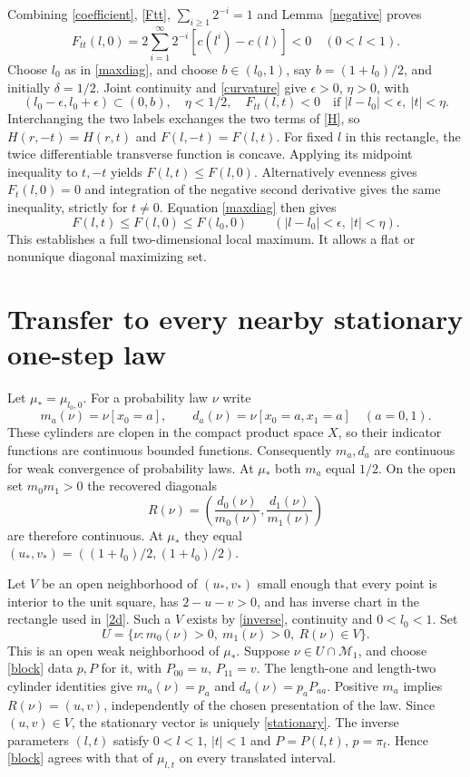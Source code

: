 \documentclass[11pt]{article}
\begin{document}
Combining \eqref{coefficient}, \eqref{Ftt}, $\sum_{i\geq1}2^{-i}=1$ and Lemma~\ref{negative} proves
\begin{equation}
 F_{tt}(l,0)=2\sum_{i=1}^{\infty}2^{-i}[c(l^i)-c(l)]<0
 \quad(0<l<1).\label{curvature}
\end{equation}
Choose $l_0$ as in \eqref{maxdiag}, and choose $b\in(l_0,1)$, say $b=(1+l_0)/2$, and initially $\delta=1/2$. Joint continuity and \eqref{curvature} give $\epsilon>0$, $\eta>0$, with
\[
 (l_0-\epsilon,l_0+\epsilon)\subset(0,b),\quad \eta<1/2,
 \quad F_{tt}(l,t)<0\quad\text{if }|l-l_0|<\epsilon,\ |t|<\eta.
\]
Interchanging the two labels exchanges the two terms of \eqref{H}, so $H(r,-t)=H(r,t)$ and $F(l,-t)=F(l,t)$. For fixed $l$ in this rectangle, the twice differentiable transverse function is concave. Applying its midpoint inequality to $t,-t$ yields $F(l,t)\leq F(l,0)$. Alternatively evenness gives $F_t(l,0)=0$ and integration of the negative second derivative gives the same inequality, strictly for $t\ne0$. Equation \eqref{maxdiag} then gives
\begin{equation}
 F(l,t)\leq F(l,0)\leq F(l_0,0)\qquad
 (|l-l_0|<\epsilon,\ |t|<\eta).\label{2d}
\end{equation}
This establishes a full two-dimensional local maximum. It allows a flat or nonunique diagonal maximizing set.

\section{Transfer to every nearby stationary one-step law}
Let $\mu_* =\mu_{l_0,0}$. For a probability law $\nu$ write
\[
 m_a(\nu)=\nu[x_0=a],\qquad d_a(\nu)=\nu[x_0=a,x_1=a]
 \quad(a=0,1).
\]
These cylinders are clopen in the compact product space $X$, so their indicator functions are continuous bounded functions. Consequently $m_a,d_a$ are continuous for weak convergence of probability laws. At $\mu_*$ both $m_a$ equal $1/2$. On the open set $m_0m_1>0$ the recovered diagonals
\[
 R(\nu)=\left(\frac{d_0(\nu)}{m_0(\nu)},
                 \frac{d_1(\nu)}{m_1(\nu)}\right)
\]
are therefore continuous. At $\mu_*$ they equal $(u_*,v_*)=((1+l_0)/2,(1+l_0)/2)$.

Let $V$ be an open neighborhood of $(u_*,v_*)$ small enough that every point is interior to the unit square, has $2-u-v>0$, and has inverse chart in the rectangle used in \eqref{2d}. Such a $V$ exists by \eqref{inverse}, continuity and $0<l_0<1$. Set
\[
 U=\{\nu:m_0(\nu)>0,\ m_1(\nu)>0,\ R(\nu)\in V\}.
\]
This is an open weak neighborhood of $\mu_*$. Suppose $\nu\in U\cap\mathcal M_1$, and choose \eqref{block} data $p,P$ for it, with $P_{00}=u$, $P_{11}=v$. The length-one and length-two cylinder identities give
$m_a(\nu)=p_a$ and $d_a(\nu)=p_aP_{aa}$. Positive $m_a$ implies $R(\nu)=(u,v)$, independently of the chosen presentation of the law. Since $(u,v)\in V$, the stationary vector is uniquely \eqref{stationary}. The inverse parameters $(l,t)$ satisfy $0<l<1$, $|t|<1$ and $P=P(l,t)$, $p=\pi_t$. Hence \eqref{block} agrees with that of $\mu_{l,t}$ on every translated interval.
\end{document}
